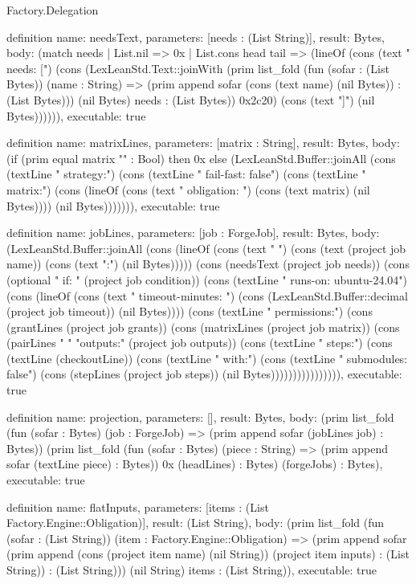 \begin{lexlean}{Factory.Delegation}
\begin{semanticmodule}
definition{
  name: needsText,
  parameters: [needs : (List String)],
  result: Bytes,
  body: (match needs
      | List.nil => 0x
      | List.cons head tail => (lineOf (cons (text "    needs: [") (cons (LexLeanStd.Text::joinWith (prim list_fold (fun (sofar : (List Bytes)) (name : String) => (prim append sofar (cons (text name) (nil Bytes)) : (List Bytes))) (nil Bytes) needs : (List Bytes)) 0x2c20) (cons (text "]") (nil Bytes)))))),
  executable: true
}

definition{
  name: matrixLines,
  parameters: [matrix : String],
  result: Bytes,
  body: (if (prim equal matrix "" : Bool) then 0x else (LexLeanStd.Buffer::joinAll (cons (textLine "    strategy:") (cons (textLine "      fail-fast: false") (cons (textLine "      matrix:") (cons (lineOf (cons (text "        obligation: ") (cons (text matrix) (nil Bytes)))) (nil Bytes))))))),
  executable: true
}

definition{
  name: jobLines,
  parameters: [job : ForgeJob],
  result: Bytes,
  body: (LexLeanStd.Buffer::joinAll (cons (lineOf (cons (text "  ") (cons (text (project job name)) (cons (text ":") (nil Bytes))))) (cons (needsText (project job needs)) (cons (optional "    if: " (project job condition)) (cons (textLine "    runs-on: ubuntu-24.04") (cons (lineOf (cons (text "    timeout-minutes: ") (cons (LexLeanStd.Buffer::decimal (project job timeout)) (nil Bytes)))) (cons (textLine "    permissions:") (cons (grantLines (project job grants)) (cons (matrixLines (project job matrix)) (cons (pairLines "    " "outputs:" (project job outputs)) (cons (textLine "    steps:") (cons (textLine (checkoutLine)) (cons (textLine "        with:") (cons (textLine "          submodules: false") (cons (stepLines (project job steps)) (nil Bytes)))))))))))))))),
  executable: true
}

definition{
  name: projection,
  parameters: [],
  result: Bytes,
  body: (prim list_fold (fun (sofar : Bytes) (job : ForgeJob) => (prim append sofar (jobLines job) : Bytes)) (prim list_fold (fun (sofar : Bytes) (piece : String) => (prim append sofar (textLine piece) : Bytes)) 0x (headLines) : Bytes) (forgeJobs) : Bytes),
  executable: true
}

definition{
  name: flatInputs,
  parameters: [items : (List Factory.Engine::Obligation)],
  result: (List String),
  body: (prim list_fold (fun (sofar : (List String)) (item : Factory.Engine::Obligation) => (prim append sofar (prim append (cons (project item name) (nil String)) (project item inputs) : (List String)) : (List String))) (nil String) items : (List String)),
  executable: true
}


\end{semanticmodule}
\end{lexlean}
